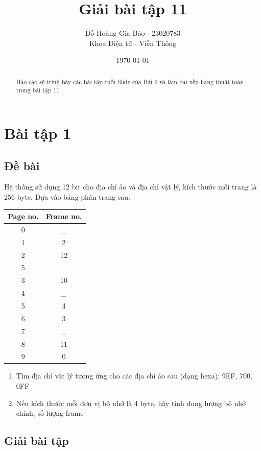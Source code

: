 \documentclass[12pt, letterpaper]{article}
\title{Giải bài tập 11}
\author{Đỗ Hoàng Gia Bảo - 23020783 \\ \small Khoa Điện tử - Viễn Thông}
\date{\today}
\begin{document}
\maketitle

\begin{abstract}
Báo cáo sẽ trình bày các bài tập cuối Slide của Bài 6 và làm bài xếp hạng thuật toán trong bài tập 11
\end{abstract}
\newpage
\tableofcontents

\newpage
{}
\setcounter{page}{3} %

\section{Bài tập 1}
\subsection{Đề bài}
Hệ thống sử dụng 12 bit cho địa chỉ ảo và địa chỉ vật lý, kích thước mỗi trang là 256 byte. Dựa vào bảng phân trang sau:
\begin{table}[H]
\centering
\begin{tabular}{cc}
\toprule
\textbf{Page no.} & \textbf{Frame no.} \\
\midrule
0 & \_ \\
1 & 2 \\
2 & 12 \\
5 & \_ \\
3 & 10 \\
4 & \_ \\
5 & 4 \\
6 & 3 \\
7 & \_ \\
8 & 11 \\
9 & 0 \\
\end{tabular}
\end{table}
\begin{enumerate}[label=\alph*)]
    \item Tìm địa chỉ vật lý tương ứng cho các địa chỉ ảo sau (dạng hexa): 9EF, 700, 0FF
    \item Nếu kích thước mỗi đơn vị bộ nhớ là 4 byte, hãy tính dung lượng bộ nhớ chính, số lượng frame
\end{enumerate}
\subsection{Giải bài tập}
\end{document}
